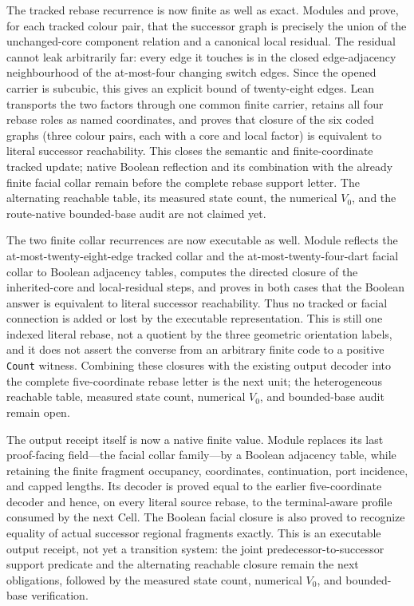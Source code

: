 \documentclass[11pt]{article}
\theoremstyle{definition}
\begin{document}
The tracked rebase recurrence is now finite as well as exact.  Modules
and
prove, for each tracked colour pair, that the successor graph is precisely the
union of the unchanged-core component relation and a canonical local
residual.  The residual cannot leak arbitrarily far: every edge it touches is
in the closed edge-adjacency neighbourhood of the at-most-four changing
switch edges.  Since the opened carrier is subcubic, this gives an explicit
bound of twenty-eight edges.  Lean transports the two factors through one
common finite carrier, retains all four rebase roles as named coordinates,
and proves that closure of the six coded graphs (three colour pairs, each
with a core and local factor) is equivalent to literal successor
reachability.  This closes the semantic and finite-coordinate tracked update;
native Boolean reflection and its combination with the already finite facial
collar remain before the complete rebase support letter.  The alternating
reachable table, its measured state count, the numerical $V_0$, and the
route-native bounded-base audit are not claimed yet.

The two finite collar recurrences are now executable as well.  Module
reflects the at-most-twenty-eight-edge tracked collar and the
at-most-twenty-four-dart facial collar to Boolean adjacency tables, computes
the directed closure of the inherited-core and local-residual steps, and
proves in both cases that the Boolean answer is equivalent to literal
successor reachability.  Thus no tracked or facial connection is added or
lost by the executable representation.  This is still one indexed literal
rebase, not a quotient by the three geometric orientation labels, and it does
not assert the converse from an arbitrary finite code to a positive
\texttt{Count} witness.  Combining these closures with the existing output
decoder into the complete five-coordinate rebase letter is the next unit;
the heterogeneous reachable table, measured state count, numerical $V_0$,
and bounded-base audit remain open.

The output receipt itself is now a native finite value.  Module
replaces its last proof-facing field---the facial collar family---by a Boolean
adjacency table, while retaining the finite fragment occupancy, coordinates,
continuation, port incidence, and capped lengths.  Its decoder is proved equal
to the earlier five-coordinate decoder and hence, on every literal source
rebase, to the terminal-aware profile consumed by the next Cell.  The Boolean
facial closure is also proved to recognize equality of actual successor
regional fragments exactly.  This is an executable output receipt, not yet a
transition system: the joint predecessor-to-successor support predicate and
the alternating reachable closure remain the next obligations, followed by
the measured state count, numerical $V_0$, and bounded-base verification.
\end{document}
